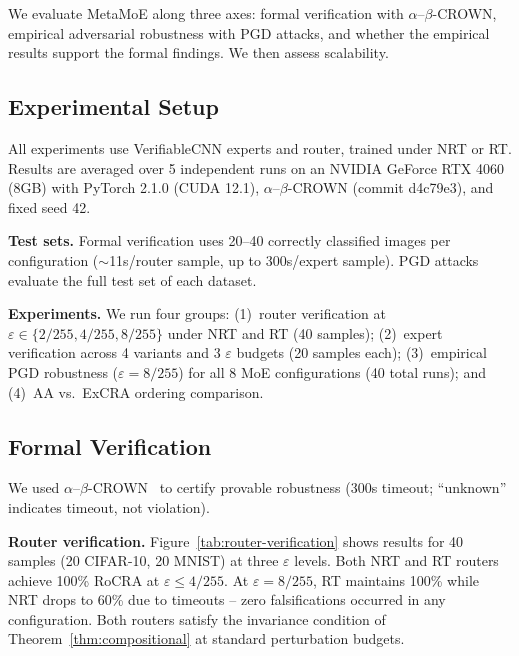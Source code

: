 \documentclass[runningheads]{llncs}
\begin{document}
We evaluate \textsf{MetaMoE} along three axes: formal verification with $\alpha$--$\beta$-CROWN, empirical adversarial robustness with PGD attacks, and whether the empirical results support the formal findings. We then assess scalability.

\subsection{Experimental Setup}
\label{sec:eval-setup}

All experiments use VerifiableCNN experts and router, trained under NRT or RT. Results are averaged over 5 independent runs on an NVIDIA GeForce RTX 4060 (8GB) with PyTorch 2.1.0 (CUDA 12.1), $\alpha$--$\beta$-CROWN (commit d4c79e3), and fixed seed 42.

\textbf{Test sets.} Formal verification uses 20--40 correctly classified images per configuration (${\sim}$11s/router sample, up to 300s/expert sample). PGD attacks evaluate the full test set of each dataset.

\textbf{Experiments.} We run four groups: (1)~router verification at $\varepsilon \in \{2/255,\allowbreak 4/255,\allowbreak 8/255\}$ under NRT and RT (40 samples); (2)~expert verification across 4 variants and 3 $\varepsilon$ budgets (20 samples each); (3)~empirical PGD robustness ($\varepsilon = 8/255$) for all 8 MoE configurations (40 total runs); and (4)~AA vs.\ ExCRA ordering comparison.

\subsection{Formal Verification}
\label{sec:eval-formal}

We used $\alpha$\nobreakdash--$\beta$\nobreakdash-CROWN~\cite{wang2021,xu2020abcrown,kaulen2025} to certify provable robustness (300s timeout; ``unknown'' indicates timeout, not violation).

\textbf{Router verification.}
Figure~\ref{tab:router-verification} shows results for 40 samples (20 CIFAR-10, 20 MNIST) at three $\varepsilon$ levels. Both NRT and RT routers achieve 100\% RoCRA at $\varepsilon \leq 4/255$. At $\varepsilon = 8/255$, RT maintains 100\% while NRT drops to 60\% due to timeouts -- zero falsifications occurred in any configuration. Both routers satisfy the invariance condition of Theorem~\ref{thm:compositional} at standard perturbation budgets.
\end{document}

